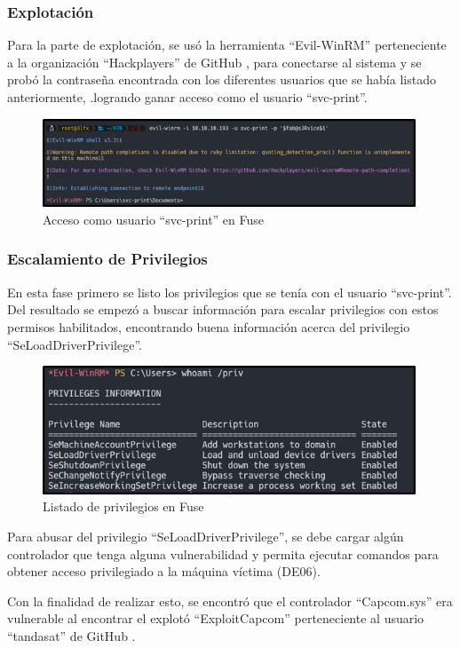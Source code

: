 \subsubsection{Explotación}
Para la parte de explotación, se usó la herramienta “Evil-WinRM” perteneciente a la organización “Hackplayers” de GitHub \cite{evilwinrm}, para conectarse al sistema y se probó la contraseña encontrada con los diferentes usuarios que se había listado anteriormente, .logrando ganar acceso como el usuario “svc-print”.
\begin{figure}[H]
    \centering
    \includegraphics[width=0.99\textwidth]{imagenes/acfuse.png}
    \caption{Acceso como usuario ``svc-print'' en Fuse}
\end{figure}
\subsubsection{Escalamiento de Privilegios}
En esta fase primero se listo los privilegios que se tenía con el usuario “svc-print”. Del resultado se empezó a buscar información para escalar privilegios con estos permisos habilitados, encontrando buena información acerca del privilegio “SeLoadDriverPrivilege”.
\begin{figure}[H]
    \centering
    \includegraphics[width=0.99\textwidth]{imagenes/lisprivfuse.png}
    \caption{Listado de privilegios en Fuse}
\end{figure}
Para abusar del privilegio “SeLoadDriverPrivilege”, se debe cargar algún controlador que tenga alguna vulnerabilidad y permita ejecutar comandos para obtener acceso privilegiado a la máquina víctima (DE06).

Con la finalidad de realizar esto, se encontró que el controlador “Capcom.sys” era vulnerable al encontrar el explotó “ExploitCapcom” perteneciente al usuario “tandasat” de GitHub \cite{exploitcapcom}.

